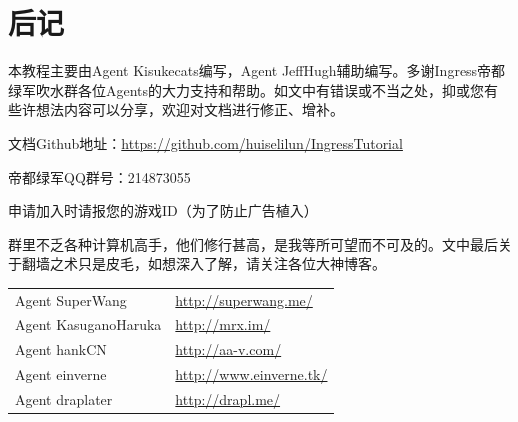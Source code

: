 \documentclass[12pt]{article}
\theoremstyle{definition}
\theoremstyle{remark}
\numberwithin{equation}{section}
\begin{document}
\section{后记}
本教程主要由Agent Kisukecats编写，Agent JeffHugh辅助编写。多谢Ingress帝都绿军吹水群各位Agents的大力支持和帮助。如文中有错误或不当之处，抑或您有些许想法内容可以分享，欢迎对文档进行修正、增补。\par

文档Github地址：\url{https://github.com/huiselilun/IngressTutorial}\par

帝都绿军QQ群号：214873055 \par
申请加入时请报您的游戏ID（为了防止广告植入）\par

群里不乏各种计算机高手，他们修行甚高，是我等所可望而不可及的。文中最后关于翻墙之术只是皮毛，如想深入了解，请关注各位大神博客。
\begin{longtable}{ll}
 Agent SuperWang & \url{http://superwang.me/}\\
Agent KasuganoHaruka  &\url{http://mrx.im/}\\
 Agent hankCN & \url{http://aa-v.com/}\\
Agent einverne & \url{http://www.einverne.tk/}\\
Agent draplater & \url{http://drapl.me/}
\end{longtable}
\end{document}
